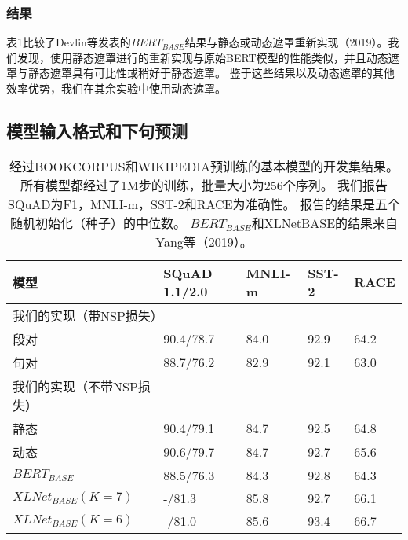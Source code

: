 \documentclass[lang=cn,11pt,a4paper,twocolumn]{elegantpaper}
\begin{document}
\subsubsection{结果}
表1比较了Devlin等发表的$BERT_{BASE}$结果与静态或动态遮罩重新实现（2019）。我们发现，使用静态遮罩进行的重新实现与原始BERT模型的性能类似，并且动态遮罩与静态遮罩具有可比性或稍好于静态遮罩。
鉴于这些结果以及动态遮罩的其他效率优势，我们在其余实验中使用动态遮罩。

\subsection{模型输入格式和下句预测}

\begin{table*}[]
  \centering
  \begin{tabular}{lllll}
  \hline
  模型               & \textbf{SQuAD 1.1/2.0} & \textbf{MNLI-m} & \textbf{SST-2} & \textbf{RACE} \\ \hline
  \multicolumn{5}{l}{我们的实现（带NSP损失）}                                                            \\
  段对               & 90.4/78.7              & 84.0            & 92.9           & 64.2          \\
  句对               & 88.7/76.2              & 82.9            & 92.1           & 63.0          \\ \hline
  我们的实现（不带NSP损失）   &                        &                 &                &               \\
  静态               & 90.4/79.1              & 84.7            & 92.5           & 64.8          \\
  动态               & 90.6/79.7              & 84.7            & 92.7           & 65.6          \\ \hline
  $BERT_{BASE}$         & 88.5/76.3              & 84.3            & 92.8           & 64.3          \\
  $XLNet_{BASE}(K = 7)$ & -/81.3                 & 85.8            & 92.7           & 66.1          \\
  $XLNet_{BASE}(K = 6)$ & -/81.0                 & 85.6            & 93.4           & 66.7          \\ \hline
  \end{tabular}
  \caption{经过BOOKCORPUS和WIKIPEDIA预训练的基本模型的开发集结果。 所有模型都经过了1M步的训练，批量大小为256个序列。 我们报告SQuAD为F1，MNLI-m，SST-2和RACE为准确性。 报告的结果是五个随机初始化（种子）的中位数。 $BERT_{BASE}$和XLNetBASE的结果来自Yang等（2019）。}
\end{table*}
\end{document}
